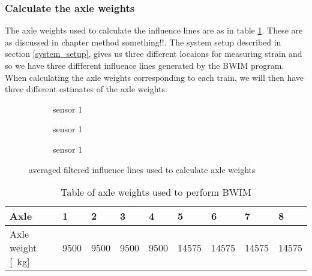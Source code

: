\subsubsection{Calculate the axle weights}
\label{section:calculating_axle_weights}
The axle weights used to calculate the influence lines are as in table \ref{table:axle_weights}. These are as discussed in chapter method something!!. The system setup described in section \ref{system_setup}, gives us three different locaions for measuring strain and so we have three diffferent influence lines generated by the BWIM program. When calculating the axle weights corresponding to each train, we will then have three different estimates of the axle weights.

\begin{figure}[h]
	\begin{subfigure}[t]{0.3\textwidth}
		
		\caption{sensor 1}
		\label{fig:sensor1}
	\end{subfigure}
	\begin{subfigure}[t]{0.3\textwidth}
		
		\caption{sensor 1}
		\label{fig:sensor1}
	\end{subfigure}
	\begin{subfigure}[t]{0.3\textwidth}
		
		\caption{sensor 1}
		\label{fig:sensor1}
	\end{subfigure}
	\caption{averaged filtered influence lines used to calculate axle weights}
	\label{averaged_filtered_infl_lines}
\end{figure}


\begin{table}[h]
	\centering
	\begin{tabularx}{\textwidth}{ |X|X|X|X|X|X|X|X|X| }
		\hline
		Axle & 1 & 2 & 3 & 4 & 5 & 6 & 7 & 8 \\
		\hline
		Axle weight [\SI{}{\kg}] & 9500 &	9500 & 9500 &	9500 & 14575 & 14575 & 14575 & 14575 \\
		\hline
	\end{tabularx}
	\caption{Table of axle weights used to perform BWIM}
	\label{table:axle_weights}
\end{table}

